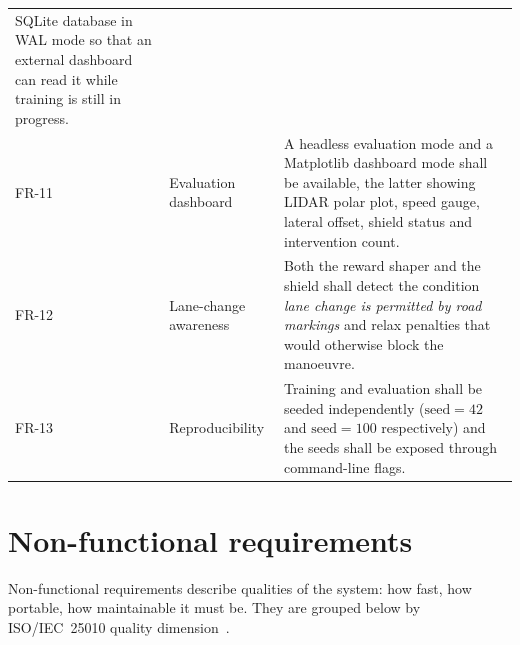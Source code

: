 \begin{table}[H]
\begin{tabular}{@{}llp{7.8cm}@{}}
        SQLite database in WAL mode so that an external dashboard can read it while training is
        still in progress. \\
    FR-11 & Evaluation dashboard     & A headless evaluation mode and a Matplotlib dashboard
        mode shall be available, the latter showing LIDAR polar plot, speed gauge, lateral
        offset, shield status and intervention count. \\
    FR-12 & Lane-change awareness    & Both the reward shaper and the shield shall detect the
        condition \emph{lane change is permitted by road markings} and relax penalties that
        would otherwise block the manoeuvre. \\
    FR-13 & Reproducibility          & Training and evaluation shall be seeded independently
        (\(\mathrm{seed}=42\) and \(\mathrm{seed}=100\) respectively) and the seeds shall be
        exposed through command-line flags. \\
    \bottomrule
  \end{tabular}
\end{table}

\section{Non-functional requirements}\label{sec:req-nonfunctional}

Non-functional requirements describe qualities of the system: how fast, how portable, how
maintainable it must be. They are grouped below by ISO/IEC~25010 quality dimension~\cite{iso2011quality}.

